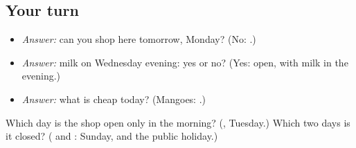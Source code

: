 \subsection*{Your turn}
\begin{itemize}
\raggedright
  \item \emph{Answer:} can you shop here tomorrow, Monday? (No: \textbf{ }.)
  \item \emph{Answer:} milk on Wednesday evening: yes or no? (Yes: open, with milk in the evening.)
  \item \emph{Answer:} what is cheap today? (Mangoes: \textbf{}.)
\end{itemize}

\begin{tcolorbox}[breakable,colback=teal!4,colframe=teal!35!black,title={Before you move on}]
Which day is the shop open only in the morning? (\textbf{}, Tuesday.) Which two days is it closed? (\textbf{} and \textbf{}: Sunday, and the public holiday.)
\end{tcolorbox}
